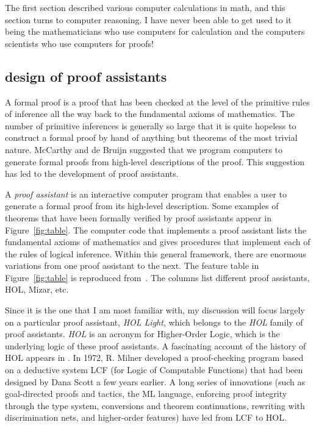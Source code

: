\documentclass{llncs}
\begin{document}
The first section described various computer calculations in math, and
this section turns to computer reasoning.  I have never been able to
get used to it being the mathematicians who use computers for
calculation and the computers scientists who use computers for proofs!

\subsection{design of proof assistants}

A formal proof is a proof that has been checked at the level of the
primitive rules of inference all the way back to the fundamental
axioms of mathematics.  The number of primitive inferences is
generally so large that it is quite hopeless to construct a formal
proof by hand of anything but theorems of the most trivial nature.
McCarthy and de Bruijn suggested that we program computers to generate
formal proofs from high-level descriptions of the proof.  This
suggestion has led to the development of proof assistants.


A {\it proof assistant} is an interactive computer program that
enables a user to generate a formal proof from its high-level
description.  Some examples of theorems that have been formally
verified by proof assistants appear in Figure~\ref{fig:table}.  The
computer code that implements a proof assistant lists the fundamental
axioms of mathematics and gives procedures that implement each of the
rules of logical inference.  Within this general framework, there are
enormous variations from one proof assistant to the next. The feature
table in Figure~\ref{fig:table} is reproduced from~\cite{wiedijk:17}.
The columns list different proof assistants, HOL, Mizar, etc.  

Since it is the one that I am most familiar with, my discussion will
focus largely on a particular proof assistant, {\it HOL Light}, which
belongs to the {\it HOL} family of proof assistants. {\it HOL} is an
acronym for Higher-Order Logic, which is the underlying logic of these
proof assistants.  A fascinating account of the history of HOL appears
in \cite{Gor}.  In 1972, R. Milner developed a proof-checking program
based on a deductive system LCF (for Logic of Computable Functions)
that had been designed by Dana Scott a few years earlier.  A long
series of innovations (such as goal-directed proofs and tactics, the ML
language, enforcing proof integrity through the type system,
conversions and theorem continuations, rewriting with discrimination
nets, and higher-order features) have led from LCF to HOL.
\end{document}
